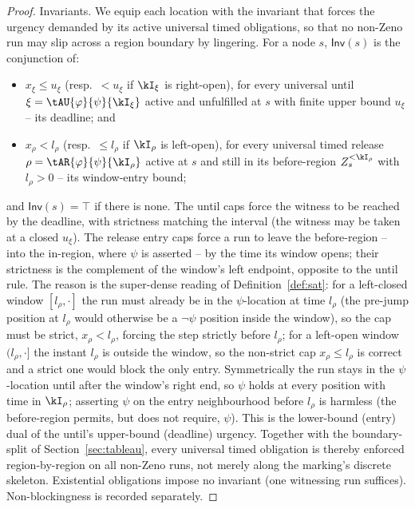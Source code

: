 \begin{proof}
{Invariants.} We equip each location with the invariant that forces the urgency demanded by its active {universal} timed obligations, so that no non-Zeno run may slip across a region boundary by lingering. For a node $s$, $\mathsf{Inv}(s)$ is the conjunction of:
\begin{itemize}
\item $x_\xi \le u_\xi$ (resp.\ $<u_\xi$ if $\kI_\xi$ is right-open), for every universal until $\xi=\tAU{\varphi}{\psi}{\kI_\xi}$ active and unfulfilled at $s$ with finite upper bound $u_\xi$ -- its {deadline}; and
\item $x_\rho < l_\rho$ (resp.\ $\le l_\rho$ if $\kI_\rho$ is left-open), for every universal timed release $\rho=\tAR{\varphi}{\psi}{\kI_\rho}$ active at $s$ and still in its {before}-region $Z_s^{<\kI_\rho}$ with $l_\rho>0$ -- its {window-entry} bound;
\end{itemize}
and $\mathsf{Inv}(s)=\top$ if there is none. The until caps force the witness to be reached by the deadline, with strictness {matching} the interval (the witness may be taken at a closed $u_\xi$). The release entry caps force a run to leave the before-region -- into the in-region, where $\psi$ {is} asserted -- by the time its window opens; their strictness is the {complement} of the window's left endpoint, opposite to the until rule. The reason is the super-dense reading of Definition~\ref{def:sat}: for a left-{closed} window $[l_\rho,\cdot]$ the run must already be in the $\psi$-location {at} time $l_\rho$ (the pre-jump position at $l_\rho$ would otherwise be a $\neg\psi$ position inside the window), so the cap must be strict, $x_\rho<l_\rho$, forcing the step strictly before $l_\rho$; for a left-{open} window $(l_\rho,\cdot]$ the instant $l_\rho$ is outside the window, so the non-strict cap $x_\rho\le l_\rho$ is correct and a strict one would block the only entry. Symmetrically the run stays in the $\psi$-location until after the window's right end, so $\psi$ holds at every position with time in $\kI_\rho$; asserting $\psi$ on the entry neighbourhood before $l_\rho$ is harmless (the before-region permits, but does not require, $\psi$). This is the lower-bound (entry) dual of the until's upper-bound (deadline) urgency. Together with the boundary-split of Section~\ref{sec:tableau}, every universal timed obligation is thereby enforced region-by-region on {all} non-Zeno runs, not merely along the marking's discrete skeleton. Existential obligations impose no invariant (one witnessing run suffices). Non-blockingness is recorded separately.


\end{proof}
